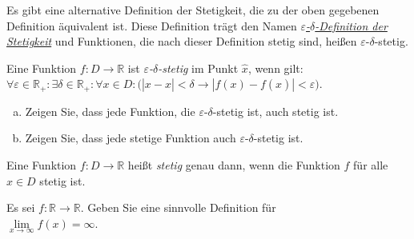 \noindent
Es gibt eine alternative Definition der Stetigkeit, die zu der oben gegebenen Definition
\"aquivalent ist. Diese Definition tr\"agt den Namen 
\href{http://de.wikipedia.org/wiki/Epsilon-Delta-Kriterium#Stetigkeit_reeller_Funktionen}{\emph{$\varepsilon$-$\delta$-Definition der Stetigkeit}} 
und Funktionen, die nach dieser Definition stetig sind, hei{\ss}en $\varepsilon$-$\delta$-stetig.

\begin{Definition} 
  Eine Funktion $f:D \rightarrow \mathbb{R}$ ist \emph{$\varepsilon$-$\delta$-stetig} im Punkt
  $\widehat{x}$, wenn gilt: 
  \\[0.2cm]
  \hspace*{1.3cm}
  $\forall \varepsilon \in \mathbb{R}_+: \exists \delta \in \mathbb{R}_+: \forall x \in D: 
   \bigl(|x - \widehat{x}| < \delta \rightarrow |f(x) - f(\widehat{x})| < \varepsilon\bigr)$.
  \eod
\end{Definition}


\exercise
\begin{enumerate}[(a)]
\item Zeigen Sie, dass jede Funktion, die $\varepsilon$-$\delta$-stetig ist,
      auch stetig ist.
\item Zeigen Sie, dass jede stetige Funktion auch $\varepsilon$-$\delta$-stetig ist.
      \eox
\end{enumerate}


\begin{Definition} \lb
Eine Funktion $f:D \rightarrow \mathbb{R}$ hei{\ss}t \emph{stetig} genau dann, wenn
die Funktion $f$ f\"ur alle $\widehat{x} \in D$ stetig ist.
\eod
\end{Definition}

\exercise
Es sei $f: \mathbb{R} \rightarrow \mathbb{R}$.  Geben Sie eine sinnvolle Definition f\"ur 
\\[0.2cm]
\hspace*{1.3cm}
$\lim\limits_{x\rightarrow\infty} f(x) = \infty$.
\eox

